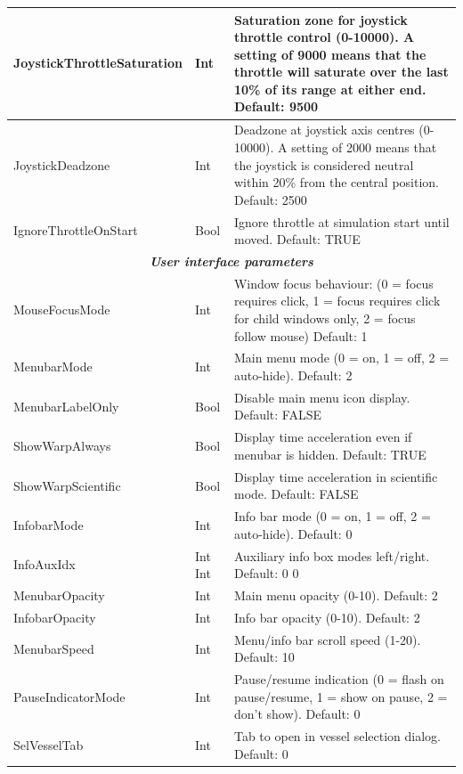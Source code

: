 \documentclass[Orbiter User Manual.tex]{subfiles}
\begin{document}
\begin{longtable}{ |p{}|p{}|p{}| }
	\hline\rule{0pt}{2ex}
	JoystickThrottleSaturation & Int & Saturation zone for joystick throttle control (0-10000). A setting of 9000 means that the throttle will saturate over the last 10\% of its range at either end. Default: 9500\\
	\hline\rule{0pt}{2ex}
	JoystickDeadzone & Int & Deadzone at joystick axis centres (0-10000). A setting of 2000 means that the joystick is considered neutral within 20\% from the central position. Default: 2500\\
	\hline\rule{0pt}{2ex}
	IgnoreThrottleOnStart & Bool & Ignore throttle at simulation start until moved. Default: TRUE\\
	\hline
	\multicolumn{3}{|c|}{\rule{0pt}{2ex}\textbf{\textit{User interface parameters}}}\\
	\hline\rule{0pt}{2ex}
	MouseFocusMode & Int & Window focus behaviour: (0 = focus requires click, 1 = focus requires click for child windows only, 2 = focus follow mouse) Default: 1\\
	\hline\rule{0pt}{2ex}
	MenubarMode & Int & Main menu mode (0 = on, 1 = off, 2 = auto-hide). Default: 2\\
	\hline\rule{0pt}{2ex}
	MenubarLabelOnly & Bool & Disable main menu icon display. Default: FALSE\\
	\hline\rule{0pt}{2ex}
	ShowWarpAlways & Bool & Display time acceleration even if menubar is hidden. Default: TRUE\\
	\hline\rule{0pt}{2ex}
	ShowWarpScientific & Bool & Display time acceleration in scientific mode. Default: FALSE\\
	\hline\rule{0pt}{2ex}
	InfobarMode & Int & Info bar mode (0 = on, 1 = off, 2 = auto-hide). Default: 0\\
	\hline\rule{0pt}{2ex}
	InfoAuxIdx & Int Int & Auxiliary info box modes left/right. Default: 0 0\\
	\hline\rule{0pt}{2ex}
	MenubarOpacity & Int & Main menu opacity (0-10). Default: 2\\
	\hline\rule{0pt}{2ex}
	InfobarOpacity & Int & Info bar opacity (0-10). Default: 2\\
	\hline\rule{0pt}{2ex}
	MenubarSpeed & Int & Menu/info bar scroll speed (1-20). Default: 10\\
	\hline\rule{0pt}{2ex}
	PauseIndicatorMode & Int & Pause/resume indication (0 = flash on pause/resume, 1 = show on pause, 2 = don't show). Default: 0\\
	\hline\rule{0pt}{2ex}
	SelVesselTab & Int & Tab to open in vessel selection dialog. Default: 0\\

\end{longtable}
\end{document}
